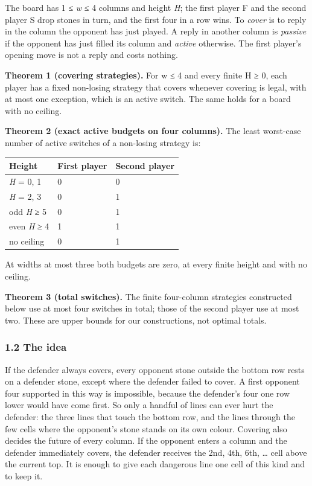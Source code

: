 \documentclass[
  a4paper,
]{article}
\newcounter{none} %
\begin{document}
The board has 1 ≤ \emph{w} ≤ 4 columns and height \emph{H}; the first
player F and the second player S drop stones in turn, and the first four
in a row wins. To \emph{cover} is to reply in the column the opponent
has just played. A reply in another column is \emph{passive} if the
opponent has just filled its column and \emph{active} otherwise. The
first player's opening move is not a reply and costs nothing.

\textbf{Theorem 1 (covering strategies).} For w ≤ 4 and every finite H ≥
0, each player has a fixed non-losing strategy that covers whenever
covering is legal, with at most one exception, which is an active
switch. The same holds for a board with no ceiling.

\textbf{Theorem 2 (exact active budgets on four columns).} The least
worst-case number of active switches of a non-losing strategy is:

{\def\LTcaptype{none} %
\begin{longtable}[]{@{}lll@{}}
\toprule\noalign{}
Height & First player & Second player \\
\midrule\noalign{}
\endhead
\bottomrule\noalign{}
\endlastfoot
\emph{H} = 0, 1 & 0 & 0 \\
\emph{H} = 2, 3 & 0 & 1 \\
odd \emph{H} ≥ 5 & 0 & 1 \\
even \emph{H} ≥ 4 & 1 & 1 \\
no ceiling & 0 & 1 \\
\end{longtable}
}

At widths at most three both budgets are zero, at every finite height
and with no ceiling.

\textbf{Theorem 3 (total switches).} The finite four-column strategies
constructed below use at most four switches in total; those of the
second player use at most two. These are upper bounds for our
constructions, not optimal totals.

\subsubsection{1.2 The idea}\label{the-idea}

If the defender always covers, every opponent stone outside the bottom
row rests on a defender stone, except where the defender failed to
cover. A first opponent four supported in this way is impossible,
because the defender's four one row lower would have come first. So only
a handful of lines can ever hurt the defender: the three lines that
touch the bottom row, and the lines through the few cells where the
opponent's stone stands on its own colour. Covering also decides the
future of every column. If the opponent enters a column and the defender
immediately covers, the defender receives the 2nd, 4th, 6th, \ldots{}
cell above the current top. It is enough to give each dangerous line one
cell of this kind and to keep it.
\end{document}

